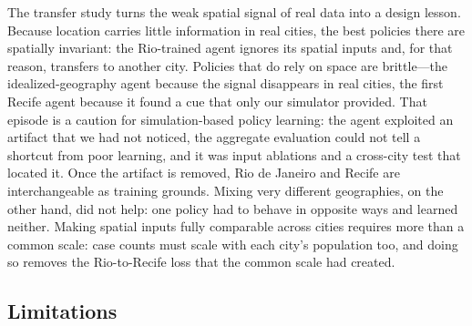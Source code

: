 \documentclass[11pt,a4paper]{article}
\begin{document}
The transfer study turns the weak spatial signal of real data into a design lesson. Because location carries little information in real cities, the best policies there are spatially invariant: the Rio-trained agent ignores its spatial inputs and, for that reason, transfers to another city. Policies that do rely on space are brittle---the idealized-geography agent because the signal disappears in real cities, the first Recife agent because it found a cue that only our simulator provided. That episode is a caution for simulation-based policy learning: the agent exploited an artifact that we had not noticed, the aggregate evaluation could not tell a shortcut from poor learning, and it was input ablations and a cross-city test that located it. Once the artifact is removed, Rio de Janeiro and Recife are interchangeable as training grounds. Mixing very different geographies, on the other hand, did not help: one policy had to behave in opposite ways and learned neither. Making spatial inputs fully comparable across cities requires more than a common scale: case counts must scale with each city's population too, and doing so removes the Rio-to-Recife loss that the common scale had created.

\subsection{Limitations}
\end{document}
